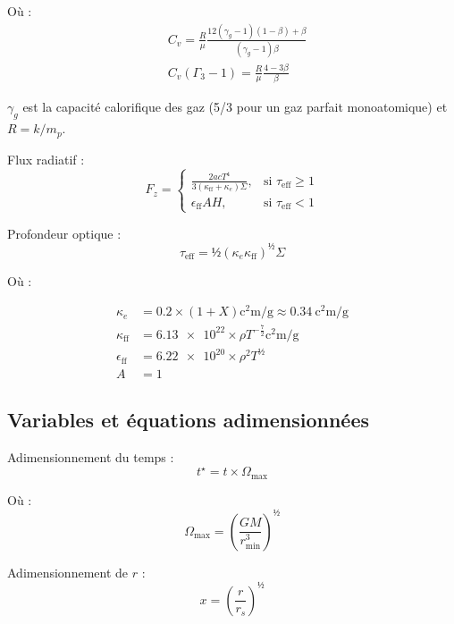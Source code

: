 Où :
\begin{align}
    &C_v = \frac{R}{\mu} \frac{12 (\gamma_g − 1)(1 − \beta) + \beta}{(\gamma_g − 1) \beta} \\
    &C_v (\Gamma_3 − 1) = \frac{R}{\mu} \frac{4 − 3\beta}{\beta}
\end{align}

$\gamma_g$ est la capacité calorifique des gaz (\num{5/3} pour un gaz parfait monoatomique) et $R = k / m_p$.

Flux radiatif :
\begin{equation}
    F_z =
    \begin{cases}
        \frac{2 a c T^4}{3 (\kappa_\mathrm{ff} + \kappa_e)\Sigma}, &\text{si $\tau_\mathrm{eff} \geq 1$} \\
        \epsilon_\mathrm{ff} A H, &\text{si $\tau_\mathrm{eff} < 1$}
    \end{cases}
\end{equation}

Profondeur optique :
\begin{equation}
    \tau_\mathrm{eff} = ½ (\kappa_e \kappa_\mathrm{ff})^½ \Sigma
\end{equation}

Où :

\begin{align}
    \kappa_e &= \num{0.2} × (1+X) \si{\square\centi\meter\per\gram} \approx \SI{0.34}{\square\centi\meter\per\gram} \\
    \kappa_\mathrm{ff} &= \num{6.13e22} × \rho T^{-\frac{7}{2}} \si{\square\centi\meter\per\gram}\\
    \epsilon_\mathrm{ff} &= \num{6.22e20} × \rho^2 T^½ \\
    A &= 1
\end{align}

\subsection{Variables et équations adimensionnées}

Adimensionnement du temps :
\begin{equation}
    t^\star = t × \Omega_\mathrm{max}
\end{equation}

Où :
\begin{equation}
    \Omega_\mathrm{max} = \left( \frac{G M}{r^3_\mathrm{min}} \right)^½
\end{equation}

Adimensionnement de $r$ :
\begin{equation}
    x = \left( \frac{r}{r_s} \right)^½
\end{equation}

